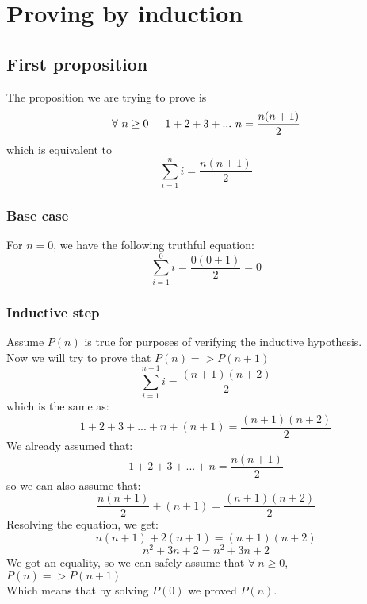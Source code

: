 \documentclass{article}
\begin{document}
	\pagebreak
	
	\section{Proving by induction}
	\subsection{First proposition}
	The proposition we are trying to prove is\\
	\begin{equation}
		\forall\ n \geq 0 \indent 1 + 2 + 3 + ...\ n = \frac{n(n+1)}{2}\\
	\end{equation}
	which is equivalent to\\
	\begin{equation}
		\sum^{n}_{i=1}{i} = \frac{n(n+1)}{2}
	\end{equation}
	
	\subsubsection{Base case}
	For $n = 0$, we have the following truthful equation:
	\begin{equation}
		\sum^{0}_{i=1}{i} = \frac{0(0+1)}{2} = 0
	\end{equation}
	
	\subsubsection{Inductive step}
	Assume $P(n)$ is true for purposes of verifying the inductive hypothesis.\\
	Now we will try to prove that $P(n) => P(n + 1)$
	\begin{equation}
		\sum^{n + 1}_{i=1}{i} = \frac{(n + 1)(n + 2)}{2}
	\end{equation}
	which is the same as:
	\begin{equation}
		1 + 2 + 3 + ... + n + (n + 1) = \frac{(n + 1)(n + 2)}{2}
	\end{equation}
	We already assumed that:
	\begin{equation}
		1 + 2 + 3 + ... + n = \frac{n(n + 1)}{2}
	\end{equation}
	so we can also assume that:
	\begin{equation}
		\frac{n(n + 1)}{2} + (n + 1) = \frac{(n + 1)(n + 2)}{2}
	\end{equation}
	Resolving the equation, we get:
	\begin{equation}
		{n(n + 1)} + 2(n + 1) = (n + 1)(n + 2)
	\end{equation}
	\begin{equation}
		{n^2 + 3n + 2} = n^2 + 3n + 2
	\end{equation}
	We got an equality, so we can safely assume that $\forall\ n \geq 0 $, $P(n) => P(n + 1)$\\
	Which means that by solving $P(0)$ we proved $P(n)$.
	
\end{document}
